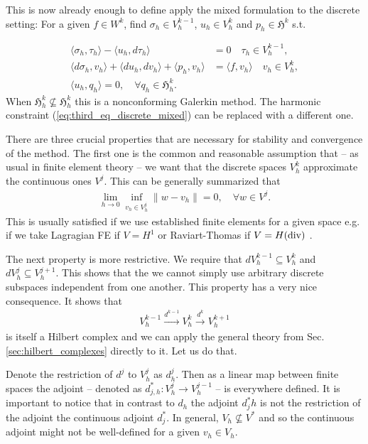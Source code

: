 \documentclass[../master_thesis.tex]{subfiles}
\begin{document}
This is now already enough to define apply the mixed formulation to the discrete setting: 
For a given $f \in W^k$, find $\sigma_h \in V_h^{k-1}$, $u_h \in V_h^k$ and 
$p_h \in \mathfrak{H}^k$ s.t.

\begin{align}
    \langle \sigma_h, \tau_h \rangle - \langle u_h, d\tau_h \rangle &= 0 \quad \tau_h \in V_h^{k-1},
    \\ \langle d\sigma_h, v_h \rangle + \langle du_h, dv_h \rangle + \langle p_h, v_h \rangle 
        &= \langle f, v_h \rangle \quad v_h \in V_h^k,
    \\ \langle u_h, q_h \rangle = 0, \quad \forall q_h \in \mathfrak{H}^k_h \label{eq:third_eq_discrete_mixed}.
\end{align}
When $\mathfrak{H}_h^k \not\subseteq \mathfrak{H}^k_h$ this is a nonconforming 
Galerkin method. The harmonic constraint (\ref{eq:third_eq_discrete_mixed}) can 
be replaced with a different one.

There are three crucial properties that are necessary for stability and convergence 
of the method. The first one is the common and reasonable assumption that 
-- as usual in finite element theory -- we want that the discrete spaces $V_h^k$
approximate the continuous ones $V^j$. This can be generally summarized that 
\begin{align*}
    \lim_{h \rightarrow 0} \inf_{v_h \in V_h^j} \lVert w - v_h \rVert = 0, \quad \forall w \in V^j.
\end{align*}
This is usually satisfied if we use established finite elements for a given space 
e.g. if we take Lagragian FE if $V = H^1$ or Raviart-Thomas if $V=H(\operatorname{div})$ \cite{}.

The next property is more restrictive. We require that $dV_h^{k-1} \subseteq V_h^k$ 
and $dV_h^j \subseteq V_h^{j+1}$. This shows that the we cannot simply use arbitrary 
discrete subspaces independent from one another. This property has a very nice
consequence. 
It shows that 
\begin{align*}
    V_h^{k-1} \xrightarrow{d^{k-1}} V_h^k \xrightarrow{d^k} V_h^{k+1}
\end{align*}
is itself a Hilbert complex and we can apply the general theory from 
Sec. \ref{sec:hilbert_complexes} directly to it. Let us do that.

Denote the restriction of $d^j$ to $V_h^j$ as $d_h^j$. Then as a linear map 
between finite spaces the adjoint -- denoted as $d_{j,h}^*: V_h^j \rightarrow V_h^{j-1}$ -- 
is everywhere defined. It is important to notice that in contrast to $d_h$ 
the adjoint $d^*_jh$ is not the restriction of the adjoint the continuous adjoint $d^*_j$.
In general, $V_h \not\subseteq V^*$ and so the continuous adjoint might not be 
well-defined for a given $v_h \in V_h$. 
\end{document}
